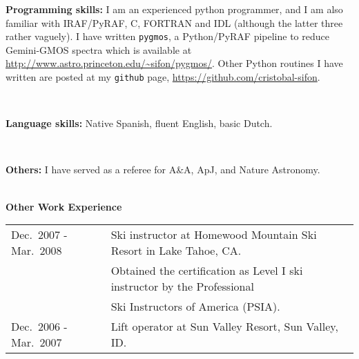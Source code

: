 \documentclass[11pt]{article}
\newcommand\technical[2]{
  \noindent
  \begin{minipage}{0.03\linewidth}
    \null
  \end{minipage}
  \begin{minipage}{0.97\linewidth}
    {\large\bf #1:} #2
  \end{minipage}\\
  }
\begin{document}
\technical{Programming skills}
          {I am an experienced python programmer, and I am also familiar with IRAF/PyRAF, C, FORTRAN and IDL (although the latter three rather vaguely). I have written {\tt pygmos}, a Python/PyRAF pipeline to reduce Gemini-GMOS spectra which is available at \url{http://www.astro.princeton.edu/\~sifon/pygmos/}. Other Python routines I have written are posted at my \texttt{github} page, \url{https://github.com/cristobal-sifon}.}

\vspace{0.1cm}
\technical{Language skills}{Native Spanish, fluent English, basic Dutch.}

\vspace{-0.2cm}
\technical{Others}{I have served as a referee for A\&A, ApJ, and Nature Astronomy.}


\vspace{0.4cm}
\noindent
{\bf\Large Other Work Experience}\\
\vspace{-0.2cm}

\begin{table}[h!]
\begin{tabular}{l l}
Dec.~2007 - Mar.~2008 & Ski instructor at Homewood Mountain Ski Resort in Lake Tahoe, CA.\\
                      & Obtained the certification as Level I ski instructor  by the Professional\\
                      & Ski Instructors of America (PSIA).\\
Dec.~2006 - Mar.~2007 & Lift operator at Sun Valley Resort, Sun Valley, ID.
\end{tabular}
\end{table}


\pagebreak
\end{document}
